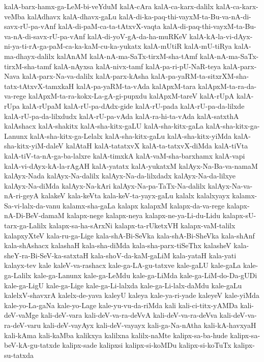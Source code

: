 {kalA-barx-hamx-ga-LeM-bi-veYduM
kalA-cAra
kalA-ca-karx-dalilx
kalA-ca-karx-veMba
kalAdhavx
kalA-dhavx-gaLu
kalA-di-ka-paq-thi-vayxM-ta-Bu-va-nA-di-savx-rU-pa-vAnf
kalA-di-paM-ca-ta-tAtxvX-vaqta
kalA-di-paq-thi-vayxM-ta-Bu-va-nA-di-savx-rU-pa-vAnf
kalA-di-yoV-gA-da-ha-muRKeV
kalA-kA-la-vi-dAyx-ni-ya-ti-rA-ga-paM-ca-ka-kaM-cu-ka-yukatx
kalA-mUtiR
kalA-mU-tiRya
kalA-ma-dhayx-dalilx
kalAnAM
kalA-nA-ma-SaTx-tirxM-sha-tAmf
kalA-nA-ma-SaTx-tirxM-sha-tamf
kalA-nAyxsa
kalA-nivx-tamf
kalA-pa-ri-pU-NaR-teya
kalA-parx-Nava
kalA-parx-Na-va-dalilx
kalA-parx-kAsha
kalA-pa-yaRM-ta-sitxrXM-sha-tatx-tAtxvX-tamxkaH
kalA-pa-yaRM-ta-vAda
kalApxM-tara
kalApxM-ta-ra-da-va-rege
kalApxM-ta-ra-kokx-La-gA-gi-pupxdu
kalApxM-tareV
kalA-rUpA
kalA-rUpa
kalA-rUpaM
kalA-rU-pa-dAdx-gide
kalA-rU-pada
kalA-rU-pa-da-lilxde
kalA-rU-pa-da-lilxdudx
kalA-rU-pa-vAda
kalA-ra-hi-ta-vAda
kalA-satxthA
kalAshacx
kalA-shakitx
kalA-sha-kitx-gaLU
kalA-sha-kitx-gaLa
kalA-sha-kitx-ga-Lanunx
kalA-sha-kitx-ga-Lelalx
kalA-sha-kitx-gaLu
kalA-sha-kitx-yiMda
kalA-sha-kitx-yiM-daleV
kalAtaH
kalA-tatatxvX
kalA-ta-tatxvX-diMda
kalA-tiVta
kalA-tiV-ta-nA-ga-ba-lalxre
kalA-timxkA
kalA-vaM-sha-barxhamx
kalA-vapi
kalA-vi-dAyx-kA-la-rAgAH
kalA-yatatx
kalA-yukatxM
kalAyx-Na-Ba-va-namaM
kalAyx-Nada
kalAyx-Na-dalilx
kalAyx-Na-da-lilxdadx
kalAyx-Na-da-lilxye
kalAyx-Na-diMda
kalAyx-Na-kAri
kalAyx-Na-pa-TaTx-Na-dalilx
kalAyx-Na-va-nA-ri-geyA
kalakeV
kala-keVta
kala-keV-ta-yayx-gaLu
kalalx
kalalxyayx
kalamx-Sa-vi-lalx-da-vanu
kalamx-sha-gaLa
kalapx
kalapxM
kalapx-da-va-rege
kalapx-nA-Di-BeV-damaM
kalapx-nege
kalapx-neya
kalapx-ne-ya-Li-du-Lidu
kalapx-sU-tarx-ga-Lalilx
kalapx-sa-ha-sArxNi
kalapx-ta-rUketxVH
kalapx-vaM-talilx
kalapxyXteV
kala-ru-ga-Lige
kala-shA-Bi-SeVka
kala-shA-Bi-SheVka
kala-shAnf
kala-shAshacx
kalashaH
kala-sha-diMda
kala-sha-parx-tiSeThx
kalasheV
kala-sheY-ra-Bi-SeV-ka-satxtaH
kala-shoV-da-kaM-gaLiM
kala-yataH
kala-yati
kalayx-tev
kale
kaleV-va-rashacx
kale-ga-LA-gu-tatxve
kale-gaLU
kale-gaLa
kale-ga-Lalilx
kale-ga-Lanunx
kale-ga-LeMdu
kale-ga-LiMda
kale-ga-LiM-do-Da-gUDi
kale-ga-LigU
kale-ga-Lige
kale-ga-Li-lalxda
kale-ga-Li-lalx-daMdu
kale-gaLu
kalelxV-shavxrA
kalelx-de-yava
kaleyU
kaleya
kale-ya-ri-yade
kaleyeV
kale-yiMda
kale-yo-La-gaNa
kale-yo-Lage
kale-yu-vu-da-riMda
kali
kali-ci-titx-yAMDa
kali-deV-vaMge
kali-deV-vara
kali-deV-va-ra-deVvA
kali-deV-va-ra-deVva
kali-deV-va-ra-deV-varu
kali-deV-vayAyx
kali-deV-vayayx
kali-ga-Na-nAtha
kali-kA-havxyaH
kali-kAma
kali-kaMba
kalikxya
kalilxna
kalilx-naMte
kalipx-sa-ba-hude
kalipx-sa-beV-kA-gu-tatxde
kalipx-sade
kalipxsi
kalipx-si-koMDu
kalipx-si-koTuTx
kalipx-su-tatxda
}
